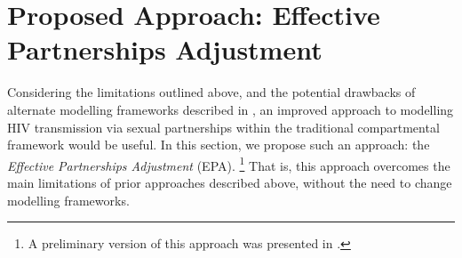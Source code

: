 \section{Proposed Approach: Effective Partnerships Adjustment}\label{foi.prop}
Considering the limitations outlined above, and
the potential drawbacks of alternate modelling frameworks described in ,
an improved approach to modelling HIV transmission via sexual partnerships
within the traditional compartmental framework would be useful.
In this section, we propose such an approach:
the \emph{Effective Partnerships Adjustment} (EPA).%
\footnote{A preliminary version of this approach was presented in \cite{Knight2022smdm}.}
That is, this approach overcomes
the main limitations of prior approaches described above,
without the need to change modelling frameworks.
